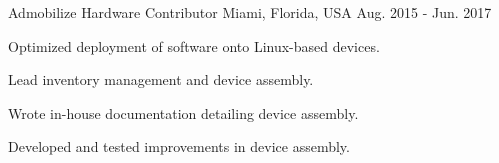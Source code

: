 \begin{cventries}
  \cventry
    {Admobilize} %
    {Hardware Contributor} %
    {Miami, Florida, USA} %
    {Aug. 2015 - Jun. 2017} %
    {
      \begin{cvitems} %
        \item {Optimized deployment of software onto Linux-based devices.}
        \item {Lead inventory management and device assembly.}
        \item {Wrote in-house documentation detailing device assembly.}
        \item {Developed and tested improvements in device assembly.}
      \end{cvitems}
    }

\end{cventries}